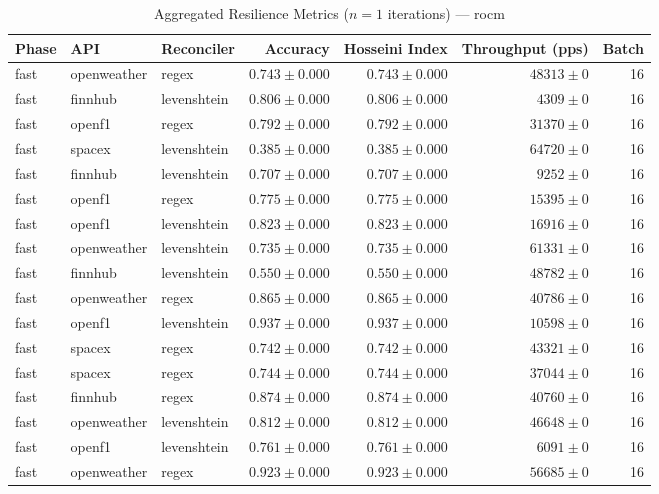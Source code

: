 
\begin{table}[htbp]
\caption{Aggregated Resilience Metrics ($n=1$ iterations) --- rocm}
\begin{tabular}{l l l r r r r}
\hline
Phase & API & Reconciler & Accuracy & Hosseini Index & Throughput (pps) & Batch \\
\hline
fast & openweather & regex & $0.743\pm0.000$ & $0.743\pm0.000$ & $48313\pm0$ & 16 \\
fast & finnhub & levenshtein & $0.806\pm0.000$ & $0.806\pm0.000$ & $4309\pm0$ & 16 \\
fast & openf1 & regex & $0.792\pm0.000$ & $0.792\pm0.000$ & $31370\pm0$ & 16 \\
fast & spacex & levenshtein & $0.385\pm0.000$ & $0.385\pm0.000$ & $64720\pm0$ & 16 \\
fast & finnhub & levenshtein & $0.707\pm0.000$ & $0.707\pm0.000$ & $9252\pm0$ & 16 \\
fast & openf1 & regex & $0.775\pm0.000$ & $0.775\pm0.000$ & $15395\pm0$ & 16 \\
fast & openf1 & levenshtein & $0.823\pm0.000$ & $0.823\pm0.000$ & $16916\pm0$ & 16 \\
fast & openweather & levenshtein & $0.735\pm0.000$ & $0.735\pm0.000$ & $61331\pm0$ & 16 \\
fast & finnhub & levenshtein & $0.550\pm0.000$ & $0.550\pm0.000$ & $48782\pm0$ & 16 \\
fast & openweather & regex & $0.865\pm0.000$ & $0.865\pm0.000$ & $40786\pm0$ & 16 \\
fast & openf1 & levenshtein & $0.937\pm0.000$ & $0.937\pm0.000$ & $10598\pm0$ & 16 \\
fast & spacex & regex & $0.742\pm0.000$ & $0.742\pm0.000$ & $43321\pm0$ & 16 \\
fast & spacex & regex & $0.744\pm0.000$ & $0.744\pm0.000$ & $37044\pm0$ & 16 \\
fast & finnhub & regex & $0.874\pm0.000$ & $0.874\pm0.000$ & $40760\pm0$ & 16 \\
fast & openweather & levenshtein & $0.812\pm0.000$ & $0.812\pm0.000$ & $46648\pm0$ & 16 \\
fast & openf1 & levenshtein & $0.761\pm0.000$ & $0.761\pm0.000$ & $6091\pm0$ & 16 \\
fast & openweather & regex & $0.923\pm0.000$ & $0.923\pm0.000$ & $56685\pm0$ & 16 \\

\end{tabular}
\end{table}
